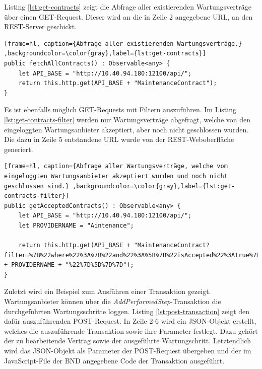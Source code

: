 Listing \ref{lst:get-contracts} zeigt die Abfrage aller existierenden Wartungsverträge über einen GET-Request. Dieser wird an die in Zeile 2 angegebene URL, an den REST-Server geschickt.

\begin{lstfloat}
\begin{lstlisting}[frame=hl, caption={Abfrage aller existierenden Wartungsverträge.} ,backgroundcolor=\color{gray},label={lst:get-contracts}]
public fetchAllContracts() : Observable<any> {
    let API_BASE = "http://10.40.94.180:12100/api/";
    return this.http.get(API_BASE + "MaintenanceContract");
}
\end{lstlisting} 
\end{lstfloat}

Es ist ebenfalls möglich GET-Requests mit Filtern auszuführen. Im Listing \ref{lst:get-contracts-filter} werden nur Wartungsverträge abgefragt, welche von den eingeloggten Wartungsanbieter akzeptiert, aber noch nicht geschlossen wurden. Die dazu in Zeile 5 entstandene URL wurde von der REST-Weboberfläche generiert. 

\begin{lstfloat}
\begin{lstlisting}[frame=hl, caption={Abfrage aller Wartungsverträge, welche vom eingeloggten Wartungsanbieter akzeptiert wurden und noch nicht geschlossen sind.} ,backgroundcolor=\color{gray},label={lst:get-contracts-filter}]
public getAcceptedContracts() : Observable<any> {
    let API_BASE = "http://10.40.94.180:12100/api/";
    let PROVIDERNAME = "Aintenance";

    return this.http.get(API_BASE + "MaintenanceContract?filter=%7B%22where%22%3A%7B%22and%22%3A%5B%7B%22isAccepted%22%3Atrue%7D%2C%7B%22isClosed%22%3Afalse%7D%2C%20%7B%22maintenanceProvider%22%3A%22resource%3Abiz.innovationcenter.maintenance.MaintenanceProvider%23" + PROVIDERNAME + "%22%7D%5D%7D%7D");
}
\end{lstlisting} 
\end{lstfloat}

Zuletzt wird ein Beispiel zum Ausführen einer Transaktion gezeigt. Wartungsanbieter können über die \textit{AddPerformedStep}-Transaktion die durchgeführten Wartungsschritte loggen. Listing \ref{lst:post-transaction} zeigt den dafür auszuführenden POST-Request. In Zeile 2-6 wird ein JSON-Objekt erstellt, welches die auszuführende Transaktion sowie ihre Parameter festlegt. Dazu gehört der zu bearbeitende Vertrag sowie der ausgeführte Wartungschritt. Letztendlich wird das JSON-Objekt als Parameter der POST-Request übergeben und der im JavaScript-File der \acs{BND} angegebene Code der Transaktion ausgeführt.

